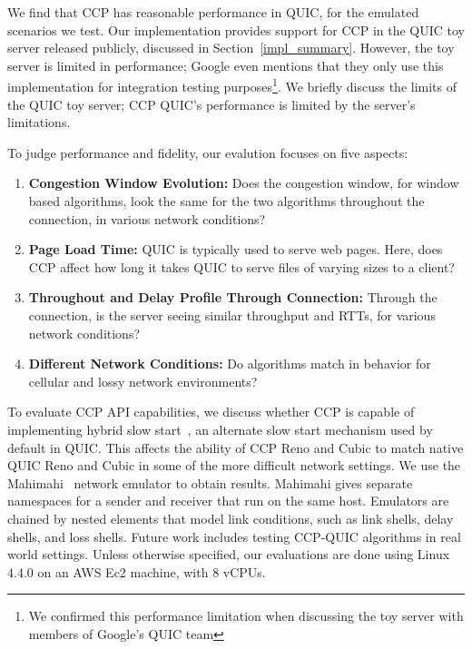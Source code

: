 We find that CCP has reasonable performance in QUIC, for the emulated scenarios we test.
Our implementation provides support for CCP in the QUIC toy server released publicly, discussed in Section~\ref{impl_summary}.
However, the toy server is limited in performance; Google even mentions that they only use this implementation for integration testing purposes\footnote{We confirmed this performance limitation when discussing the toy server with members of Google's QUIC team}.
We briefly discuss the limits of the QUIC toy server; CCP QUIC's performance is limited by the server's limitations.

To judge performance and fidelity, our evalution focuses on five aspects:
    \begin{enumerate}
        \item{\textbf{Congestion Window Evolution:} Does the congestion window, for window based algorithms, look the same for the two algorithms throughout the connection, in various network conditions?}
        \item{\textbf{Page Load Time:} QUIC is typically used to serve web pages. Here, does CCP affect how long it takes QUIC to serve files of varying sizes to a client?}
        \item{\textbf{Throughout and Delay Profile Through Connection:} Through the connection, is the server seeing similar throughput and RTTs, for various network conditions?}
        \item{\textbf{Different Network Conditions: } Do algorithms match in behavior for cellular and lossy network environments?}
    \end{enumerate}
To evaluate CCP API capabilities, we discuss whether CCP is capable of implementing hybrid slow start~\cite{hybrid_slow_start}, an alternate slow start mechanism used by default in QUIC.
This affects the ability of CCP Reno and Cubic to match native QUIC Reno and Cubic in some of the more difficult network settings.
We use the Mahimahi~\cite{mahimahi} network emulator to obtain results. Mahimahi gives separate namespaces for a sender and receiver that run on the same host. Emulators are chained by nested elements that model link conditions, such as link shells, delay shells, and loss shells.
Future work includes testing CCP-QUIC algorithms in real world settings.
Unless otherwise specified, our evaluations are done using Linux 4.4.0 on an AWS Ec2 machine, with 8 vCPUs.
